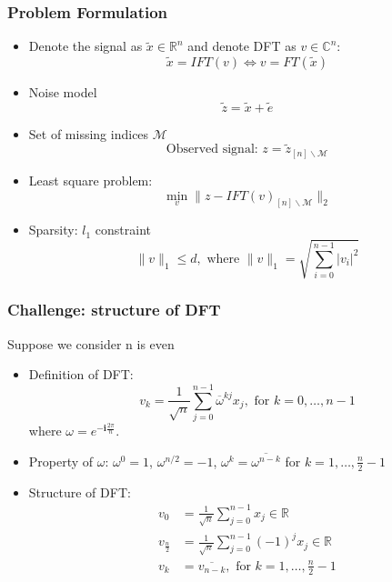 \documentclass{beamer}
\begin{document}
\begin{frame}
\frametitle{Problem Formulation}
\begin{itemize}
\item Denote the signal as $\widetilde{x}\in\mathbb{R}^n$ and denote DFT as $v\in\mathbb{C}^{n}$:
\begin{equation}
    \widetilde{x} = IFT(v)\iff v = FT(\widetilde{x})
\end{equation}
\item Noise model
\begin{equation}
    \widetilde{z} = \widetilde{x} + \widetilde{e}
\end{equation}
\item Set of missing indices $\mathcal{M}$
\begin{equation}
   \text{Observed signal: } z = \widetilde{z}_{[n]\backslash\mathcal{M}}
\end{equation}
\item Least square problem:
\begin{equation}
    \min_{v}\|z - IFT(v)_{[n]\backslash\mathcal{M}}\|_2
\end{equation}
\item Sparsity: $l_1$ constraint
\begin{equation}
    \|v\|_1\leq d, \text{ where }\|v\|_1 = \sqrt{\sum_{i=0}^{n-1}|v_i|^2}
\end{equation}
\end{itemize}
\end{frame}

\begin{frame}
\frametitle{Challenge: structure of DFT}
Suppose we consider n is even
\begin{itemize}
\item Definition of DFT: 
\begin{equation}\label{FTdef}
    v_{k} = \frac{1}{\sqrt{n}}\sum_{j=0}^{n-1}\overline{\omega}^{kj}x_j,\text{ for }k = 0,\dots,n-1
\end{equation}
where $\omega = e^{-\mathbf{i}\frac{2\pi}{n}}$.
\item Property of $\omega$: $\omega^0 = 1$, $\omega^{n/2}=-1$, $\omega^k = \overline{\omega^{n-k}}$ for $k=1,\dots,\frac{n}{2}-1$
\item Structure of DFT:
\begin{equation}
    \begin{aligned}
    v_0 &= \frac{1}{\sqrt{n}}\sum_{j=0}^{n-1}x_j\in\mathbb{R}\\
    v_{\frac{n}{2}} &= \frac{1}{\sqrt{n}}\sum_{j=0}^{n-1}(-1)^j x_j\in\mathbb{R}\\
    v_k &= \overline{v_{n-k}},\text{ for }k=1,\dots,\frac{n}{2}-1
    \end{aligned}
\end{equation}
\end{itemize}
\end{frame}
\end{document}
